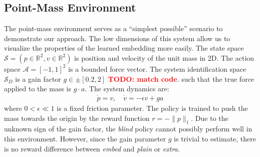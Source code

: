\documentclass{article}
\newcommand{\R}{\mathbb{R}}
\newcommand{\TODO}[1]{\textcolor{red}{\textbf{TODO: #1}}}
\newcommand{\cA}{\mathcal{A}}
\newcommand{\cS}{\mathcal{S}}
\newcommand{\blind}{\emph{blind}}
\newcommand{\plain}{\emph{plain}}
\newcommand{\extra}{\emph{extra}}
\newcommand{\embed}{\emph{embed}}
\begin{document}
\subsection{Point-Mass Environment}
\label{pointmass}
The point-mass environment serves as a ``simplest possible'' scenario to demonstrate our approach.
The low dimensions of this system allow us to visualize the properties of the learned embedding more easily.
The state space $\cS = (p \in \R^2, v \in \R^2)$ is position and velocity of the unit mass in 2D.
The action space $\cA = [-1, 1]^2$ is a bounded force vector.
The system identification space $\cS_D$ is a gain factor $g \in \pm[0.2, 2]$ \TODO{match code}.
such that the true force applied to the mass is $g \cdot a$.
The system dynamics are:
\begin{equation}\begin{split}
\dot p = v, \quad \dot v = -\epsilon v + ga
\end{split}\end{equation}
where $0 < \epsilon \ll 1$ is a fixed friction parameter.
The policy is trained to push the mass towards the origin
by the reward function $r = -\|p\|_1$.
Due to the unknown sign of the gain factor, the \blind{} policy cannot possibly perform well in this environment.
However, since the gain parameter $g$ is trivial to estimate,
there is no reward difference between \embed{} and \plain{} or \extra{}.

\end{document}
